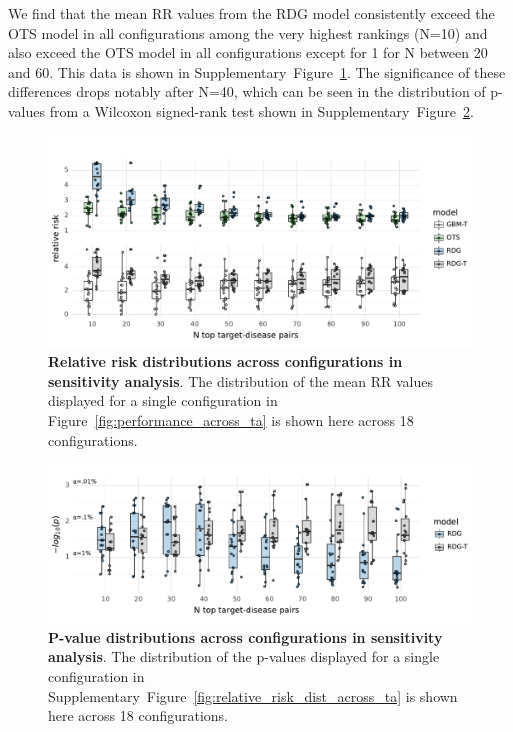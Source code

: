 \documentclass{article}
\begin{document}
We find that the mean RR values from the RDG model consistently exceed the OTS model in all configurations among the very highest rankings (N=10) and also exceed the OTS model in all configurations except for 1 for N between 20 and 60. This data is shown in Supplementary~Figure~\ref{fig:sensitivity_relative_risk}. The significance of these differences drops notably after N=40, which can be seen in the distribution of p-values from a Wilcoxon signed-rank test shown in Supplementary~Figure~\ref{fig:sensitivity_p_values}.



\begin{figure}[H]
  \centering
  \captionsetup{width=.9\linewidth}
  \includegraphics[width=1\textwidth]{sensitivity_relative_risk.pdf}
  \caption{
    \textbf{Relative risk distributions across configurations in sensitivity analysis}.
    The distribution of the mean RR values displayed for a single configuration in Figure~\ref{fig:performance_across_ta} is shown here across 18 configurations.
  }
  \label{fig:sensitivity_relative_risk}
\end{figure}

\begin{figure}[H]
  \centering
  \captionsetup{width=.9\linewidth}
  \includegraphics[width=1\textwidth]{sensitivity_p_values.pdf}
  \caption{
    \textbf{P-value distributions across configurations in sensitivity analysis}.
    The distribution of the p-values displayed for a single configuration in Supplementary~Figure~\ref{fig:relative_risk_dist_across_ta} is shown here across 18 configurations.
  }
  \label{fig:sensitivity_p_values}
\end{figure}


  
 
\end{document}
